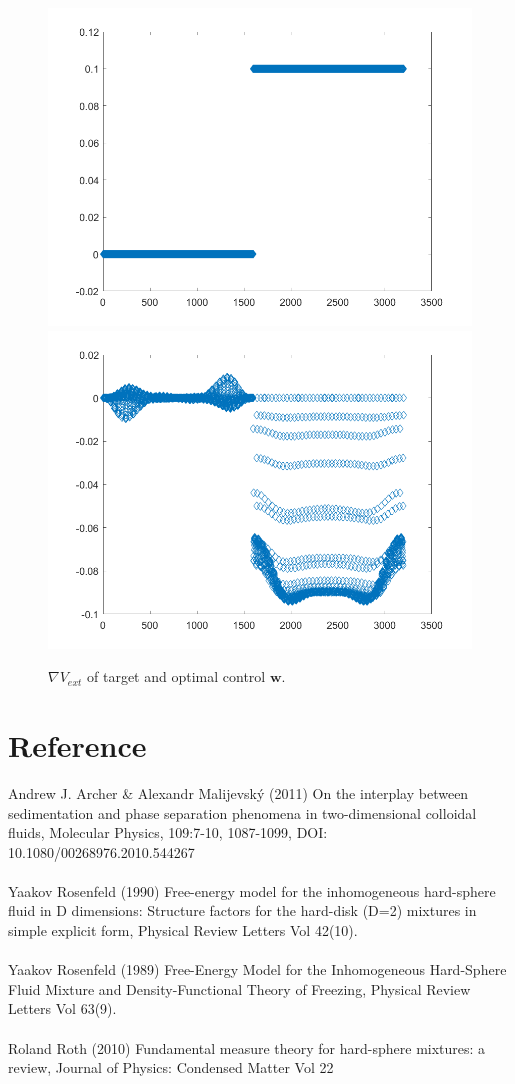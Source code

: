 \documentclass[11pt, a4paper]{article}
\theoremstyle{definition}
\newcommand{\w}{\mathbf{w}}
\begin{document}
\begin{figure}[h]
	\centering
	\includegraphics[scale=0.35]{V1.png}
	\includegraphics[scale=0.35]{W1.png}
	\caption{$\nabla V_{ext}$ of target and optimal control $\w$.} 
	\label{F1a}
\end{figure}
\section{Reference}
Andrew J. Archer \& Alexandr Malijevský (2011) On the interplay between sedimentation and phase separation phenomena in two-dimensional colloidal fluids, Molecular Physics, 109:7-10, 1087-1099, DOI: 10.1080/00268976.2010.544267\\
\\
Yaakov Rosenfeld (1990) Free-energy model for the inhomogeneous hard-sphere fluid in D dimensions: Structure factors for the hard-disk (D=2) mixtures in simple explicit form, Physical Review Letters Vol 42(10).\\
\\
Yaakov Rosenfeld (1989) Free-Energy Model for the Inhomogeneous Hard-Sphere Fluid Mixture and Density-Functional Theory of Freezing, Physical Review Letters Vol 63(9).\\
\\
Roland Roth (2010) Fundamental measure theory for hard-sphere mixtures: a review, Journal of Physics: Condensed Matter Vol 22
\end{document}
